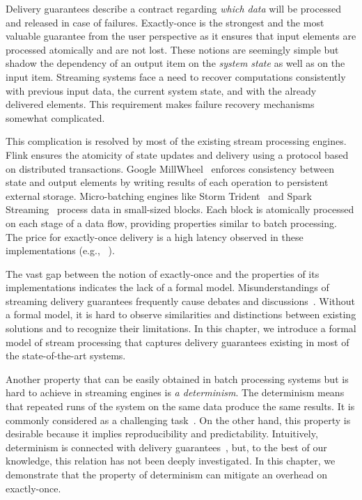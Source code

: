 
\label {fs-intro-seciton}

Delivery guarantees describe a contract regarding {\em which data} will be processed and released in case of failures. 
Exactly-once is the strongest and the most valuable guarantee from the user perspective as it ensures that input elements are processed atomically and are not lost. These notions are seemingly simple but shadow the dependency of an output item on the {\em system state} as well as on the input item. 
Streaming systems face a need to recover computations consistently with previous input data, the current system state, and with the already delivered elements.
This requirement makes failure recovery mechanisms somewhat complicated. 

This complication is resolved by most of the existing stream processing engines. 
Flink ensures the atomicity of state updates and delivery using a protocol based on distributed transactions. 
Google MillWheel~\cite{Akidau:2013:MFS:2536222.2536229} enforces consistency between state and output elements by writing results of each operation to persistent external storage. 
Micro-batching engines like Storm Trident~\cite{apache:storm:trident} and Spark Streaming~\cite{Zaharia:2012:DSE:2342763.2342773} process data in small-sized blocks. 
Each block is atomically processed on each stage of a data flow, providing properties similar to batch processing. 
The price for exactly-once delivery is a high latency observed in these implementations (e.g., ~\cite{7530084, 7474816}).

The vast gap between the notion of exactly-once and the properties of its implementations indicates the lack of a formal model. 
Misunderstandings of streaming delivery guarantees frequently cause debates and discussions~\cite{JerryPengStreamIO, PaperTrail}. Without a formal model, it is hard to observe similarities and distinctions between existing solutions and to recognize their limitations. In this chapter, we introduce a formal model of stream processing that captures delivery guarantees existing in most of the state-of-the-art systems.

Another property that can be easily obtained in batch processing systems but is hard to achieve in streaming engines is {\em a determinism}. 
The determinism means that repeated runs of the system on the same data produce the same results. It is commonly considered as a challenging task~\cite{Zacheilas:2017:MDS:3093742.3093921}. On the other hand, this property is desirable because it implies reproducibility and predictability. Intuitively, determinism is connected with delivery guarantees~\cite{Stonebraker:2005:RRS:1107499.1107504}, but, to the best of our knowledge, this relation has not been deeply investigated. In this chapter, we demonstrate that the property of determinism can mitigate an overhead on exactly-once. 


